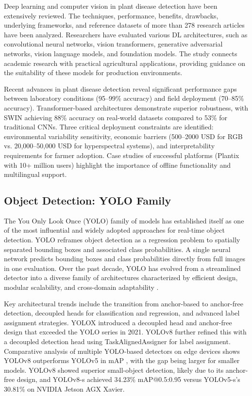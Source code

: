 \documentclass[10pt,a4paper,twocolumn]{article}
\begin{document}
Deep learning and computer vision in plant disease detection have been extensively reviewed. The techniques, performance, benefits, drawbacks, underlying frameworks, and reference datasets of more than 278 research articles have been analyzed. Researchers have evaluated various DL architectures, such as convolutional neural networks, vision transformers, generative adversarial networks, vision language models, and foundation models. The study connects academic research with practical agricultural applications, providing guidance on the suitability of these models for production environments.

Recent advances in plant disease detection reveal significant performance gaps between laboratory conditions (95--99\% accuracy) and field deployment (70--85\% accuracy). Transformer-based architectures demonstrate superior robustness, with SWIN achieving 88\% accuracy on real-world datasets compared to 53\% for traditional CNNs. Three critical deployment constraints are identified: environmental variability sensitivity, economic barriers (500--2000 USD for RGB vs. 20,000--50,000 USD for hyperspectral systems), and interpretability requirements for farmer adoption. Case studies of successful platforms (Plantix with 10+ million users) highlight the importance of offline functionality and multilingual support.

\subsection{Object Detection: YOLO Family}

The You Only Look Once \cite{redmon2016you} (YOLO) family of models has established itself as one of the most influential and widely adopted approaches for real-time object detection. YOLO reframes object detection as a regression problem to spatially separated bounding boxes and associated class probabilities. A single neural network predicts bounding boxes and class probabilities directly from full images in one evaluation. Over the past decade, YOLO has evolved from a streamlined detector into a diverse family of architectures characterized by efficient design, modular scalability, and cross-domain adaptability \cite{ramos2025decade}.

Key architectural trends include the transition from anchor-based to anchor-free detection, decoupled heads for classification and regression, and advanced label assignment strategies. YOLOX \cite{ge2021yolox} introduced a decoupled head and anchor-free design that exceeded the YOLO series in 2021. YOLOv8 further refined this with a decoupled detection head using TaskAlignedAssigner for label assignment. Comparative analysis of multiple YOLO-based detectors on edge devices shows YOLOv8 outperforms YOLOv5 in mAP \cite{azevedo2024comparative}, with the gap being larger for smaller models. \cite{sun2025yoloplant} YOLOv8 showed superior small-object detection, likely due to its anchor-free design, and YOLOv8-s achieved 34.23\% mAP@0.5:0.95 versus YOLOv5-s's 30.81\% on NVIDIA Jetson AGX Xavier.
\end{document}
